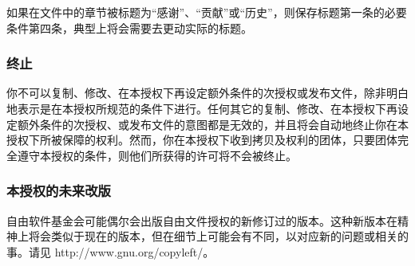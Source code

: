 
如果在文件中的章节被标题为``感谢''、``贡献''或``历史''，则保存标题第一条的必要条件第四条，典型上将会需要去更动实际的标题。

\subsubsection{终止}


你不可以复制、修改、在本授权下再设定额外条件的次授权或发布文件，除非明白地表示是在本授权所规范的条件下进行。任何其它的复制、修改、在本授权下再设定额外条件的次授权、或发布文件的意图都是无效的，并且将会自动地终止你在本授权下所被保障的权利。然而，你在本授权下收到拷贝及权利的团体，只要团体完全遵守本授权的条件，则他们所获得的许可将不会被终止。


\subsubsection{本授权的未来改版}


自由软件基金会可能偶尔会出版自由文件授权的新修订过的版本。这种新版本在精神上将会类似于现在的版本，但在细节上可能会有不同，以对应新的问题或相关的事。请见 http://www.gnu.org/copyleft/。

